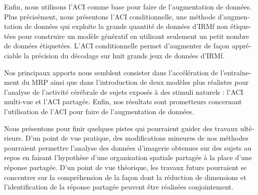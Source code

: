 \begin{otherlanguage}{french}
Enfin, nous utilisons l'ACI comme base pour faire de l'augmentation de données.
%
Plus précisément, nous présentons l’ACI conditionnelle, une méthode d'augmentation de données qui exploite la grande quantité de données d'IRMf non étiquetées pour construire un modèle génératif en utilisant seulement un petit nombre de données étiquetées.
%
L’ACI conditionnelle permet d'augmenter de façon appréciable la précision du décodage sur huit grands jeux de données d'IRMf.

Nos principaux apports nous semblent consister dans l’accélération de l’entraînement du MRP ainsi que dans l’introduction de deux modèles plus réalistes pour l’analyse de l’activité cérébrale de sujets exposés à des stimuli naturels : l’ACI multi-vue et l’ACI partagée.
%
Enfin, nos résultats sont prometteurs concernant l’utilisation de l’ACI pour faire de l’augmentation de données.

Nous présentons pour finir quelques pistes qui pourraient guider des travaux
ultérieurs. D’un point de vue pratique, des modifications mineures de nos
méthodes pourraient permettre l’analyse des données d’imagerie obtenues sur des
sujets au repos en faisant l’hypothèse d’une organisation spatiale partagée à la
place d’une réponse partagée.
%
D’un point de vue théorique, les travaux futurs
pourraient se concentrer sur la compréhension de la façon dont la réduction de
dimensions et l'identification de la réponse partagée peuvent être réalisées
conjointement.
\end{otherlanguage}

\endgroup

\vfill
